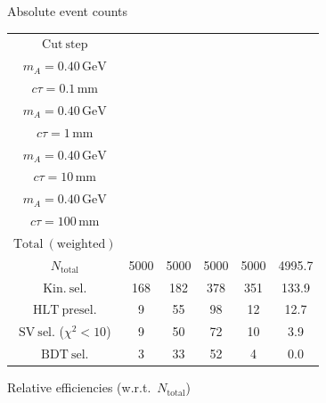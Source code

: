 \documentclass[10pt,a4paper]{article}
\renewcommand{\arraystretch}{1.4}
\begin{document}
{\footnotesize\setlength{\tabcolsep}{4pt}\renewcommand{\arraystretch}{1.05}%
\vspace{12pt}

Absolute event counts

\begin{tabular}{cccccc}
\toprule
$\mathrm{Cut\ step}$ & \shortstack{$m_{\pi}=4\,\mathrm{GeV}$\\$m_{A}=0.40\,\mathrm{GeV}$\\$c\tau=0.1\,\mathrm{mm}$} & \shortstack{$m_{\pi}=4\,\mathrm{GeV}$\\$m_{A}=0.40\,\mathrm{GeV}$\\$c\tau=1\,\mathrm{mm}$} & \shortstack{$m_{\pi}=4\,\mathrm{GeV}$\\$m_{A}=0.40\,\mathrm{GeV}$\\$c\tau=10\,\mathrm{mm}$} & \shortstack{$m_{\pi}=4\,\mathrm{GeV}$\\$m_{A}=0.40\,\mathrm{GeV}$\\$c\tau=100\,\mathrm{mm}$} & \shortstack{$\mathrm{QCD}$\\$\mathrm{Total\ (weighted)}$} \\
\midrule
$N_{\mathrm{total}}$ & 5000 & 5000 & 5000 & 5000 & 4995.7\\
$\mathrm{Kin.\ sel.}$ & 168 & 182 & 378 & 351 & 133.9\\
$\mathrm{HLT\ presel.}$ & 9 & 55 & 98 & 12 & 12.7\\
$\mathrm{SV\ sel.}$ ($\chi^2{<}10$) & 9 & 50 & 72 & 10 & 3.9\\
$\mathrm{BDT\ sel.}$ & 3 & 33 & 52 & 4 & 0.0\\
\bottomrule
\end{tabular}

\vspace{18pt}

Relative efficiencies (w.r.t.\ $N_{\mathrm{total}}$)

}
\end{document}
